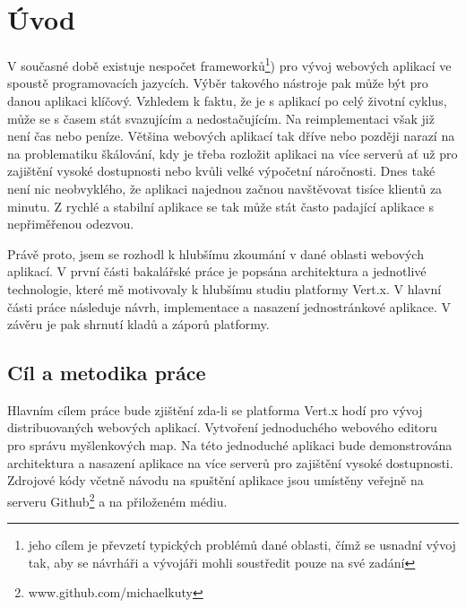 

\chapter{Úvod}

V současné době existuje nespočet frameworků\footnote{jeho cílem je převzetí typických problémů dané oblasti, čímž se usnadní vývoj tak, aby se návrháři a vývojáři mohli soustředit pouze na své zadání}) pro vývoj webových aplikací ve spoustě programovacích jazycích. 
Výběr takového nástroje pak může být pro danou aplikaci klíčový. Vzhledem k faktu, že je s aplikací po celý životní cyklus, může se s časem stát svazujícím a nedostačujícím. Na reimplementaci však již není čas nebo peníze. Většina webových aplikací tak dříve nebo později narazí na na problematiku škálování, kdy je třeba rozložit aplikaci na více serverů ať už pro zajištění vysoké dostupnosti nebo kvůli velké výpočetní náročnosti. Dnes také není nic neobvyklého, že aplikaci najednou začnou navštěvovat tisíce klientů za minutu. Z rychlé a stabilní aplikace se tak může stát často padající aplikace s nepřiměřenou odezvou.

Právě proto, jsem se rozhodl k hlubšímu zkoumání v dané oblasti webových aplikací. V první části bakalářské práce je popsána architektura a jednotlivé technologie, které mě motivovaly k hlubšímu studiu platformy Vert.x. V hlavní části práce následuje návrh, implementace a nasazení jednostránkové aplikace. V závěru je pak shrnutí kladů a záporů platformy.

\section{Cíl a metodika práce}

Hlavním cílem práce bude zjištění zda-li se platforma Vert.x hodí pro vývoj distribuovaných webových aplikací. 
Vytvoření jednoduchého webového editoru pro správu myšlenkových map. %
Na této jednoduché aplikaci bude demonstrována architektura a nasazení aplikace na více serverů pro zajištění vysoké dostupnosti.
Zdrojové kódy včetně návodu na spuštění aplikace jsou umístěny veřejně na serveru Github\footnote{www.github.com/michaelkuty} a na přiloženém médiu.

